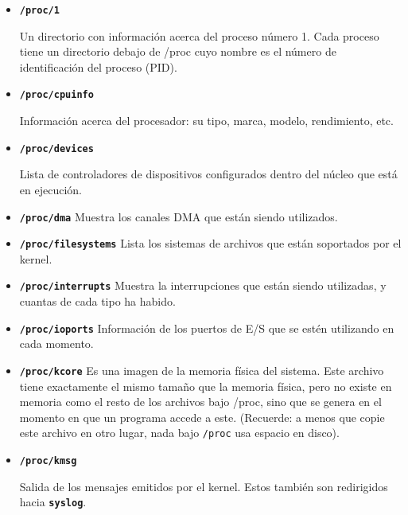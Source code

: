 \documentclass[12pt]{article}
\begin{document}
	\begin{itemize} 
	
	\item

	\textbf{\texttt{/proc/1}}

	 Un directorio con información acerca del proceso número
	1. 	Cada proceso tiene un directorio debajo de /proc cuyo nombre es
	el número de identificación del proceso (PID).  
	
	
	\item
	
	\textbf{\texttt{/proc/cpuinfo}}
	
	 Información acerca del procesador: su tipo, marca,
	modelo, 	rendimiento, etc.  
	
	
	\item
	
	\textbf{\texttt{/proc/devices}}
	
	 Lista de controladores de dispositivos configurados
	dentro 	del núcleo que está en ejecución.
	
	
	\item \textbf{\texttt{/proc/dma}}
	 Muestra los canales DMA que están siendo utilizados.
	
	
	\item
	\textbf{\texttt{/proc/filesystems}}
	 Lista los sistemas de archivos que están soportados por
	el kernel.  
	
	\item
	\textbf{\texttt{/proc/interrupts}}
	 Muestra la interrupciones que están siendo utilizadas, y
	cuantas de cada tipo ha habido.  
	
	\item \textbf{\texttt{/proc/ioports}}
	 Información de los puertos de E/S que se estén
	utilizando 	en cada momento.  
	
	\item \textbf{\texttt{/proc/kcore}}
	 Es una imagen de la memoria física del sistema. Este
	archivo tiene exactamente el mismo tamaño que la memoria física, pero no
	existe en memoria como el resto de los archivos bajo /proc, sino que se
	genera en el momento en que un programa accede a este. (Recuerde: a
	menos que copie este archivo en otro lugar, nada bajo
	\texttt{/proc} usa espacio en disco).
	
	
	\item
	
	\textbf{\texttt{/proc/kmsg}}
	
	 Salida de los mensajes emitidos por el kernel. Estos
	también son redirigidos hacia \texttt{\textbf{syslog}}.
		

\end{itemize}
\end{document}
